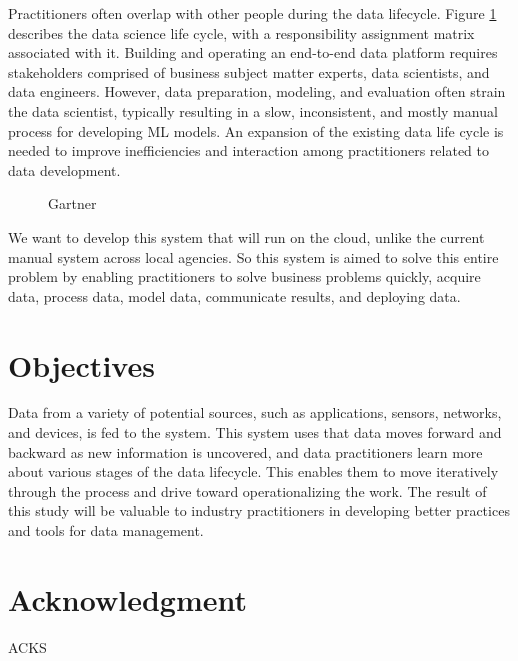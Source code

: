 \documentclass[conference]{IEEEtran}
\begin{document}
Practitioners often overlap with other people during the data lifecycle. Figure \ref{fig:sdlc}\cite{gartner} describes the data science life cycle, with a responsibility assignment matrix associated with it.  Building and operating an end-to-end data platform requires stakeholders comprised of business subject matter experts, data scientists, and data engineers. However, data preparation, modeling, and evaluation often strain the data scientist, typically resulting in a slow, inconsistent, and mostly manual process for developing ML models.  An expansion of the existing data life cycle is needed to improve inefficiencies and interaction among practitioners related to data development.

\begin{figure}[bth]
	\centering
	\caption{Gartner}
	\label{fig:sdlc}
\end{figure}

We want to develop this system that will run on the cloud, unlike the current manual system across local agencies. So this system is aimed to solve this entire problem by enabling practitioners to solve business problems quickly, acquire data, process data, model data, communicate results, and deploying data.

\section{Objectives}
Data from a variety of potential sources, such as applications, sensors, networks, and devices, is fed to the system. This system uses that data moves forward and backward as new information is uncovered, and data practitioners learn more about various stages of the data lifecycle.  This enables them to move iteratively through the process and drive toward operationalizing the work.  The result of this study will be valuable to industry practitioners in developing better practices and tools for data management.



\section*{Acknowledgment}
ACKS



{\small}
 
\end{document}
